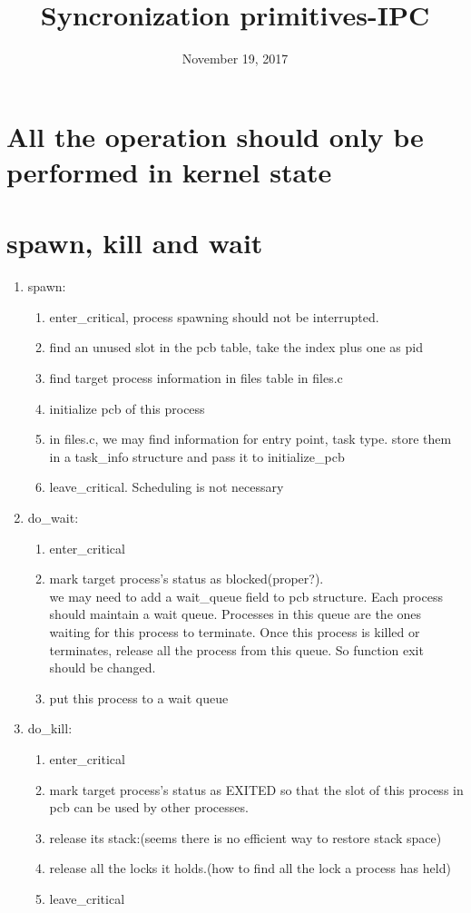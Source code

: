 \documentclass{article}
\title{Syncronization primitives-IPC}
\date{November 19, 2017}
\begin{document}
\maketitle
\section*{All the operation should only be performed in kernel state}
\section{spawn, kill and wait}
\begin{enumerate}
\item spawn:
  \begin{enumerate}
  \item enter\_critical, process spawning should not be interrupted.
  \item find an unused slot in the pcb table, take the index plus one as pid
  \item find target process information in files table in files.c
  \item initialize pcb of this process
  \item in files.c, we may find information for entry point, task type. store them in a task\_info structure and pass it to initialize\_pcb
  \item leave\_critical. Scheduling is not necessary
  \end{enumerate}
\item do\_wait:
  \begin{enumerate}
  \item enter\_critical
  \item  mark target process's status as blocked(proper?).\\
    we may need to add a wait\_queue field to pcb structure. Each process should maintain a wait queue. Processes in this queue are the ones waiting for this process to terminate. Once this process is killed or terminates, release all the process from this queue. So function exit should be changed.
  \item put this process to a wait queue
  \end{enumerate}
  \item do\_kill:
  \begin{enumerate}
  \item enter\_critical
  \item mark target process's status as EXITED so that the slot of this process in pcb can be used by other processes.
  \item release its stack:(seems there is no efficient way to restore stack space)
  \item release all the locks it holds.(how to find all the lock a process has held)
  \item leave\_critical
  \end{enumerate}
\end{enumerate}
\end{document}
